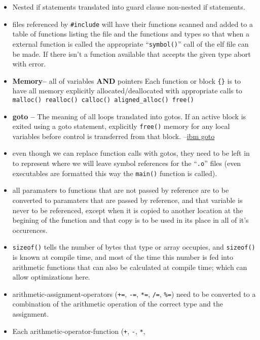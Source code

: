 \begin{itemize}
\tightlist
\item
  Nested if statements translated into guard clause non-nested if
  statements.
\item
  files referenced by \texttt{\#include} will have their functions
  scanned and added to a table of functions listing the file and the
  functions and types so that when a external function is called the
  appropriate ``\texttt{symbol()}'' call of the elf file can be made. If
  there isn't a function available that accepts the given type abort
  with error.
\item
  \textbf{Memory--} all of variables \textbf{AND} pointers Each function
  or block \texttt{\{\}} is to have all memory explicitly
  allocated/deallocated with appropriate calls to
  \texttt{malloc()\ realloc()\ calloc()\ aligned\_alloc()\ free()}
\item
  \textbf{goto --} The meaning of all loops translated into gotos. If an
  active block is exited using a goto statement, explicitly
  \texttt{free()} memory for any local variables before control is
  transferred from that block.
  --\href{https://www.ibm.com/docs/en/zos/2.1.0?topic=statements-goto-\%20statement}{ibm
  goto}
\item
  even though we can replace function calls with gotos, they need to be
  left in to represent where we will leave symbol references for the
  ``\texttt{.o}'' files (even executables are formatted this way the
  \texttt{main()} function is called).
\item
  all paramaters to functions that are not passed by reference are to be
  converted to paramaters that are passed by reference, and that
  variable is never to be referenced, except when it is copied to
  another location at the begining of the function and that copy is to
  be used in its place in all of it's occurences.
\item
  \texttt{sizeof()} tells the number of bytes that type or array
  occupies, and \texttt{sizeof()} is known at compile time, and most of
  the time this number is fed into arithmetic functions that can also be
  calculated at compile time; which can allow optimizations here.
\item
  arithmetic-assignment-operators (\texttt{+=}, \texttt{-=},
  \texttt{*=}, \texttt{/=}, \texttt{\%=}) need to be converted to a
  combination of the arithmetic operation of the correct type and the
  assignment.
\item
  Each arithmetic-operator-function (\texttt{+}, \texttt{-}, \texttt{*},

\end{itemize}
